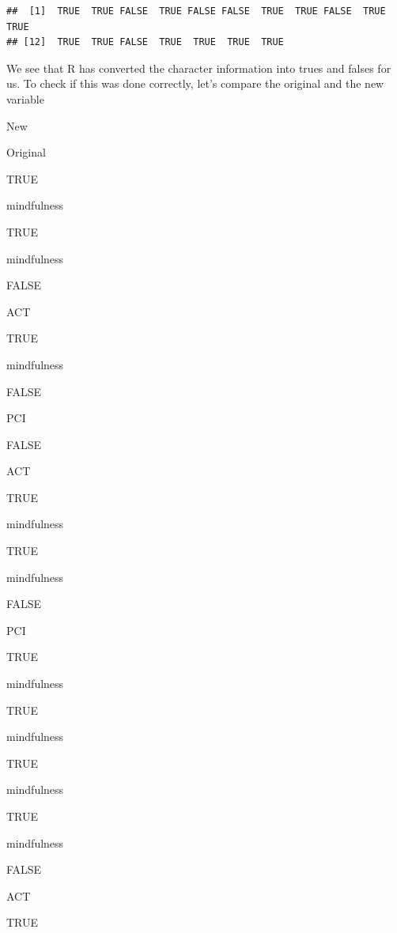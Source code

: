 \documentclass[]{book}
\newenvironment{Shaded}{\begin{snugshade}}{\end{snugshade}}
\newcommand{\DataTypeTok}[1]{\textcolor[rgb]{0.13,0.29,0.53}{#1}}
\newcommand{\KeywordTok}[1]{\textcolor[rgb]{0.13,0.29,0.53}{\textbf{#1}}}
\newcommand{\NormalTok}[1]{#1}
\newcommand{\OperatorTok}[1]{\textcolor[rgb]{0.81,0.36,0.00}{\textbf{#1}}}
\newcommand{\StringTok}[1]{\textcolor[rgb]{0.31,0.60,0.02}{#1}}
\begin{document}
\begin{verbatim}
##  [1]  TRUE  TRUE FALSE  TRUE FALSE FALSE  TRUE  TRUE FALSE  TRUE  TRUE
## [12]  TRUE  TRUE FALSE  TRUE  TRUE  TRUE  TRUE
\end{verbatim}

We see that R has converted the character information into trues and falses for us. To check if this was done correctly, let's compare the original and the new variable

\begin{Shaded}
\end{Shaded}

New

Original

TRUE

mindfulness

TRUE

mindfulness

FALSE

ACT

TRUE

mindfulness

FALSE

PCI

FALSE

ACT

TRUE

mindfulness

TRUE

mindfulness

FALSE

PCI

TRUE

mindfulness

TRUE

mindfulness

TRUE

mindfulness

TRUE

mindfulness

FALSE

ACT

TRUE
\end{document}
